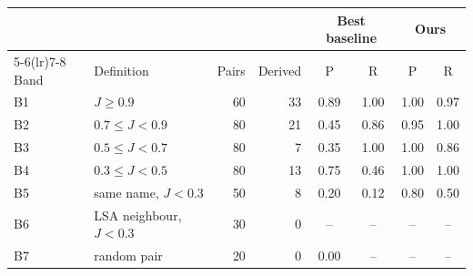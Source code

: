 \begin{tabular}{llrrcccc}
\toprule
 & & & & \multicolumn{2}{c}{Best baseline} & \multicolumn{2}{c}{Ours} \\
\cmidrule(lr){5-6}\cmidrule(lr){7-8}
Band & Definition & Pairs & Derived & P & R & P & R \\
\midrule
B1 & $J \geq 0.9$ & 60 & 33 & 0.89 & 1.00 & 1.00 & 0.97 \\
B2 & $0.7 \leq J < 0.9$ & 80 & 21 & 0.45 & 0.86 & 0.95 & 1.00 \\
B3 & $0.5 \leq J < 0.7$ & 80 & 7 & 0.35 & 1.00 & 1.00 & 0.86 \\
B4 & $0.3 \leq J < 0.5$ & 80 & 13 & 0.75 & 0.46 & 1.00 & 1.00 \\
B5 & same name, $J<0.3$ & 50 & 8 & 0.20 & 0.12 & 0.80 & 0.50 \\
B6 & LSA neighbour, $J<0.3$ & 30 & 0 & -- & -- & -- & -- \\
B7 & random pair & 20 & 0 & 0.00 & -- & -- & -- \\
\bottomrule
\end{tabular}

